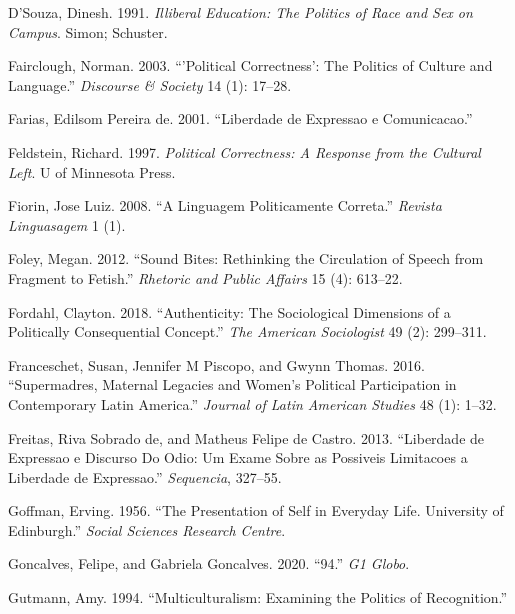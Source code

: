\documentclass[
  12pt,
]{article}
\newlength{\cslhangindent}
\newlength{\cslentryspacingunit} %
\newenvironment{CSLReferences}[2] %
 {%
  \setlength{\parindent}{0pt}
  \ifodd #1
  \let\oldpar\par
  \def\par{\hangindent=\cslhangindent\oldpar}
  \fi
  \setlength{\parskip}{#2\cslentryspacingunit}
 }%
 {}
\begin{document}
\begin{CSLReferences}{1}{0}
\leavevmode{}%
D'Souza, Dinesh. 1991. \emph{Illiberal Education: The Politics of Race
and Sex on Campus}. Simon; Schuster.

\leavevmode{}%
Fairclough, Norman. 2003. {``'Political Correctness': The Politics of
Culture and Language.''} \emph{Discourse \& Society} 14 (1): 17--28.

\leavevmode{}%
Farias, Edilsom Pereira de. 2001. {``Liberdade de Expressao e
Comunicacao.''}

\leavevmode{}%
Feldstein, Richard. 1997. \emph{Political Correctness: A Response from
the Cultural Left}. U of Minnesota Press.

\leavevmode{}%
Fiorin, Jose Luiz. 2008. {``A Linguagem Politicamente Correta.''}
\emph{Revista Linguasagem} 1 (1).

\leavevmode{}%
Foley, Megan. 2012. {``Sound Bites: Rethinking the Circulation of Speech
from Fragment to Fetish.''} \emph{Rhetoric and Public Affairs} 15 (4):
613--22.

\leavevmode{}%
Fordahl, Clayton. 2018. {``Authenticity: The Sociological Dimensions of
a Politically Consequential Concept.''} \emph{The American Sociologist}
49 (2): 299--311.

\leavevmode{}%
Franceschet, Susan, Jennifer M Piscopo, and Gwynn Thomas. 2016.
{``Supermadres, Maternal Legacies and Women's Political Participation in
Contemporary Latin America.''} \emph{Journal of Latin American Studies}
48 (1): 1--32.

\leavevmode{}%
Freitas, Riva Sobrado de, and Matheus Felipe de Castro. 2013.
{``Liberdade de Expressao e Discurso Do Odio: Um Exame Sobre as
Possiveis Limitacoes a Liberdade de Expressao.''} \emph{Sequencia},
327--55.

\leavevmode{}%
Goffman, Erving. 1956. {``The Presentation of Self in Everyday Life.
University of Edinburgh.''} \emph{Social Sciences Research Centre}.

\leavevmode{}%
Goncalves, Felipe, and Gabriela Goncalves. 2020. {``94.''} \emph{G1
Globo}.

\leavevmode{}%
Gutmann, Amy. 1994. {``Multiculturalism: Examining the Politics of
Recognition.''}


\end{CSLReferences}
\end{document}
